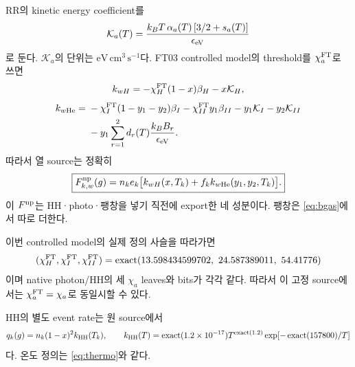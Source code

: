 RR의 kinetic energy coefficient를
\begin{equation}
\mathcal K_a(T)=
\frac{k_BT\,\alpha_a(T)\,[3/2+s_a(T)]}{\epsilon_{\rm eV}}
\label{eq:kinetic}
\end{equation}
로 둔다. $\mathcal K_a$의 단위는 $\mathrm{eV\,cm^3\,s^{-1}}$다.
FT03 controlled model의 threshold를 $\chi_a^{\rm FT}$로 쓰면
\begin{equation}
k_{wH}=-\chi_H^{\rm FT}(1-x)\beta_H-x\mathcal K_H,
\label{eq:kwH}
\end{equation}
\begin{align}
k_{w{\rm He}}={}&-\chi_I^{\rm FT}(1-y_1-y_2)\beta_I
-\chi_{II}^{\rm FT}y_1\beta_{II}
-y_1\mathcal K_I-y_2\mathcal K_{II}\nonumber\\
&-y_1\sum_{r=1}^2d_r(T)\frac{k_BB_r}{\epsilon_{\rm eV}}.
\label{eq:kwHe}
\end{align}
따라서 열 source는 정확히
\begin{equation}
\boxed{F^{\rm np}_{k,w}(g)
=n_ke_k\bigl[k_{wH}(x,T_k)+f_k k_{w{\rm He}}(y_1,y_2,T_k)\bigr].}
\label{eq:npthermal}
\end{equation}
이 $F^{\rm np}$는 HH·photo·팽창을 넣기 직전에 export한 네 성분이다. 팽창은 \eqref{eq:bgas}에서 따로 더한다.

이번 controlled model의 실제 정의 사슬을 따라가면
\begin{equation}
(\chi_H^{\rm FT},\chi_I^{\rm FT},\chi_{II}^{\rm FT})
=\operatorname{exact}(13.598434599702,\ 24.587389011,\ 54.41776)
\label{eq:thresholds}
\end{equation}
이며 native photon/HH의 세 $\chi_a$ leaves와 bits가 각각 같다.
따라서 이 고정 source에서는 $\chi_a^{\rm FT}=\chi_a$로 동일시할 수 있다.\cite{bindings,threshold_binding}

HH의 별도 event rate는 원 source에서
\begin{equation}
q_k(g)=n_k(1-x)^2 k_{\rm HH}(T_k),\qquad
k_{\rm HH}(T)=\operatorname{exact}(1.2\times10^{-17})T^{\operatorname{exact}(1.2)}
\exp[-\operatorname{exact}(157800)/T]
\label{eq:hh}
\end{equation}
다. 온도 정의는 \eqref{eq:thermo}와 같다.

